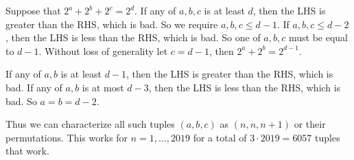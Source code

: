Suppose that $2^a+2^b+2^c=2^d$. If any of $a,b,c$ is at least $d$, then the LHS is greater than the RHS, which is bad. So we require $a,b,c\leq d-1$. If $a,b,c\leq d-2$, then the LHS is less than the RHS, which is bad. So one of $a,b,c$ must be equal to $d-1$. Without loss of generality let $c=d-1$, then $2^a+2^b=2^{d-1}$.
	
	If any of $a,b$ is at least $d-1$, then the LHS is greater than the RHS, which is bad. If any of $a,b$ is at most $d-3$, then the LHS is less than the RHS, which is bad. So $a=b=d-2$.
	
	Thus we can characterize all such tuples $(a,b,c)$ as $(n,n,n+1)$ or their permutations. This works for $n=1,\dots,2019$ for a total of $3\cdot2019=6057$ tuples that work.